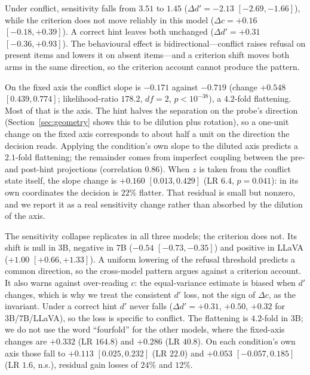 \documentclass[10pt]{article}
\begin{document}
Under conflict, sensitivity falls from $3.51$ to $1.45$ ($\Delta d'=-2.13$ $[-2.69,-1.66]$), while the criterion does not move reliably in this model ($\Delta c=+0.16$ $[-0.18,+0.39]$). A correct hint leaves both unchanged ($\Delta d'=+0.31$ $[-0.36,+0.93]$). The behavioural effect is bidirectional---conflict raises refusal on present items and lowers it on absent items---and a criterion shift moves both arms in the same direction, so the criterion account cannot produce the pattern.

On the fixed axis the conflict slope is $-0.171$ against $-0.719$ (change $+0.548$ $[0.439,0.774]$; likelihood-ratio $178.2$, $df=2$, $p<10^{-38}$), a $4.2$-fold flattening. Most of that is the axis. The hint halves the separation on the probe's direction (Section~\ref{sec:geometry} shows this to be dilution plus rotation), so a one-unit change on the fixed axis corresponds to about half a unit on the direction the decision reads. Applying the condition's own slope to the diluted axis predicts a $2.1$-fold flattening; the remainder comes from imperfect coupling between the pre- and post-hint projections (correlation $0.86$). When $z$ is taken from the conflict state itself, the slope change is $+0.160$ $[0.013,0.429]$ (LR $6.4$, $p=0.041$): in its own coordinates the decision is $22\%$ flatter. That residual is small but nonzero, and we report it as a real sensitivity change rather than absorbed by the dilution of the axis.

The sensitivity collapse replicates in all three models; the criterion does not. Its shift is null in 3B, negative in 7B ($-0.54$ $[-0.73,-0.35]$) and positive in LLaVA ($+1.00$ $[+0.66,+1.33]$). A uniform lowering of the refusal threshold predicts a common direction, so the cross-model pattern argues against a criterion account. It also warns against over-reading $c$: the equal-variance estimate is biased when $d'$ changes, which is why we treat the consistent $d'$ loss, not the sign of $\Delta c$, as the invariant. Under a correct hint $d'$ never falls ($\Delta d'=+0.31$, $+0.50$, $+0.32$ for 3B/7B/LLaVA), so the loss is specific to conflict. The flattening is $4.2$-fold in 3B; we do not use the word ``fourfold'' for the other models, where the fixed-axis changes are $+0.332$ (LR $164.8$) and $+0.286$ (LR $40.8$). On each condition's own axis those fall to $+0.113$ $[0.025,0.232]$ (LR $22.0$) and $+0.053$ $[-0.057,0.185]$ (LR $1.6$, n.s.), residual gain losses of $24\%$ and $12\%$.
\end{document}
